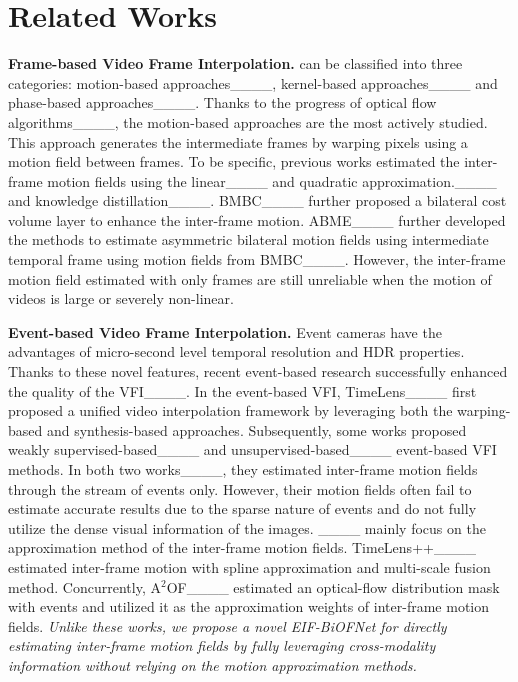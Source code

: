 \section{Related Works}
\vspace{-2pt}
\label{sec:Related_works}
\noindent\textbf{Frame-based Video Frame Interpolation.} can be classified into three categories: motion-based approaches____, kernel-based approaches____ and phase-based approaches____.
Thanks to the progress of optical flow algorithms____, the motion-based approaches are the most actively studied.
This approach generates the intermediate frames by warping pixels using a motion field between frames. 
To be specific, previous works estimated the inter-frame motion fields using the linear____  and quadratic approximation.____ and knowledge distillation____.
BMBC____ further proposed a bilateral cost volume layer to enhance the inter-frame motion.
ABME____ further developed the methods to estimate asymmetric bilateral motion fields using intermediate temporal frame using motion fields from BMBC____.
However, the inter-frame motion field estimated with only frames are still unreliable when the motion of videos is large or severely non-linear.

\noindent\textbf{Event-based Video Frame Interpolation.} Event cameras have the advantages of micro-second level temporal resolution and HDR properties.
Thanks to these novel features, recent event-based research successfully enhanced the quality of the VFI____.
In the event-based VFI, TimeLens____ first proposed a unified video interpolation framework by leveraging both the warping-based and synthesis-based approaches.
Subsequently, some works proposed weakly supervised-based____ and unsupervised-based____ event-based VFI methods.
In both two works____, they estimated inter-frame motion fields through the stream of events only.
However, their motion fields often fail to estimate accurate results due to the sparse nature of events and do not fully utilize the dense visual information of the images.
____ mainly focus on the approximation method of the inter-frame motion fields. 
TimeLens++____ estimated inter-frame motion with spline approximation and multi-scale fusion method.
Concurrently, A$^2$OF____ estimated an optical-flow distribution mask with events and utilized it as the approximation weights of inter-frame motion fields.
\textit{Unlike these works, we propose a novel EIF-BiOFNet for directly estimating inter-frame motion fields by fully leveraging cross-modality information without relying on the motion approximation methods.}


